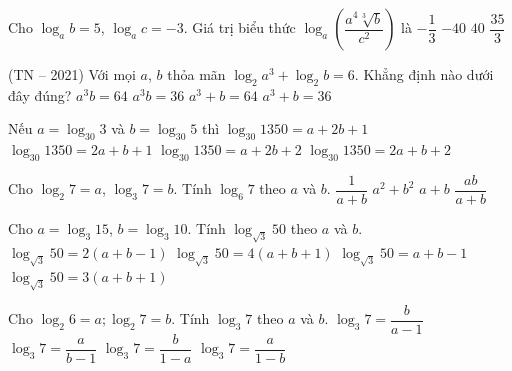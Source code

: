 \begin{ex}
	Cho $\log _a b = 5$, $\log_a c = -3$. Giá trị biểu thức $\log_a \left( \dfrac{a^4 \sqrt[3]{b}}{c^2} \right)$ là
	\choice
	{$-\dfrac{1}{3}$}
	{$-40$}
	{$40$}
	{\True $\dfrac{35}{3}$}
\end{ex}

\begin{ex} (TN -- 2021)
	Với mọi $a$, $b$ thỏa mãn $\log_{2}a^{3}+\log_{2}b=6$. Khẳng định nào dưới đây đúng?
	\choice
	{$a^{3}b=64$}
	{$a^{3}b=36$}
	{\True $a^{3}+b=64$}
	{$a^{3}+b=36$}
\end{ex}

\begin{ex}
	Nếu $a=\log_{30}3$ và $b=\log_{30}5$ thì
	\choice
	{$\log_{30}1350=a+2b+1$}
	{\True $\log_{30}1350=2a+b+1$}
	{$\log_{30}1350=a+2b+2$}
	{$\log_{30}1350=2a+b+2$}
\end{ex}

\begin{ex}
	Cho $\log_2{7}=a$, $\log_3{7}=b$. Tính $\log_6{7}$ theo $a$ và $b$.
	\choice
	{$\dfrac{1}{a+b}$}
	{$a^2+b^2$}
	{$a+b$}
	{\True $\dfrac{ab}{a+b}$}
\end{ex}

\begin{ex}
	Cho $a=\log _3 15$, $b=\log _3 10$. Tính $\log _{\sqrt{3}} 50$ theo $a$ và $b$.
	\choice
	{\True $\log _{\sqrt{3}} 50=2\left( {a+b-1} \right)$}
	{$\log _{\sqrt{3}} 50=4\left( {a+b+1} \right)$}
	{$\log _{\sqrt{3}} 50=a+b-1$}
	{$\log _{\sqrt{3}} 50=3\left( {a+b+1} \right)$}
\end{ex}

\begin{ex}
	Cho $\log_2 6 =a; \log_2 7 =b$. Tính $\log_3 7$ theo $a$ và $b$.
	\choice
	{\True $\log_3 7 = \dfrac{b}{a-1}$}
	{$\log_3 7 = \dfrac{a}{b-1}$}
	{$\log_3 7 = \dfrac{b}{1-a}$}
	{$\log_3 7 = \dfrac{a}{1-b}$}
\end{ex}

